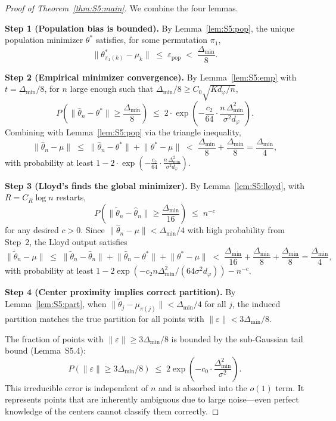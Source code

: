 \documentclass[twoside]{article}
\theoremstyle{plain}
\theoremstyle{definition}
\theoremstyle{remark}
\newcommand{\1}{\mathbf{1}}
\renewcommand{\epsilon}{\varepsilon}
\renewcommand{\phi}{\varphi}
\newcommand{\htheta}{\hat{\theta}}
\newcommand{\ttheta}{\tilde{\theta}}
\newcommand{\muk}{\mu_k}
\newcommand{\norm}[1]{\lVert#1\rVert}
\begin{document}
\begin{proof}[Proof of Theorem~\ref{thm:S5:main}]
We combine the four lemmas.

\noindent\textbf{Step 1 (Population bias is bounded).}
By Lemma~\ref{lem:S5:pop}, the unique population minimizer $\theta^*$
satisfies, for some permutation $\pi_1$,
\[
\norm{\theta^*_{\pi_1(k)}-\muk} \;\le\; \epsilon_{\mathrm{pop}}
\;<\; \frac{\Delta_{\min}}{8}.
\]

\noindent\textbf{Step 2 (Empirical minimizer convergence).}
By Lemma~\ref{lem:S5:emp} with $t=\Delta_{\min}/8$, for $n$ large
enough such that $\Delta_{\min}/8\ge C_0\sqrt{K d_\phi/n}$,
\[
P\!\left(\norm{\htheta_n-\theta^*}\ge\frac{\Delta_{\min}}{8}\right)
\;\le\; 2\cdot\exp\!\left(
          -\frac{c_2}{64}\cdot\frac{n\,\Delta_{\min}^2}{\sigma^2 d_\phi}\right).
\]
Combining with Lemma~\ref{lem:S5:pop} via the triangle inequality,
\[
\norm{\htheta_n-\mu}
\;\le\; \norm{\htheta_n-\theta^*} + \norm{\theta^*-\mu}
\;<\; \frac{\Delta_{\min}}{8} + \frac{\Delta_{\min}}{8}
= \frac{\Delta_{\min}}{4},
\]
with probability at least
$1-2\cdot\exp\!\left(-\frac{c_2}{64}\cdot\frac{n\,\Delta_{\min}^2}{\sigma^2 d_\phi}\right)$.

\noindent\textbf{Step 3 (Lloyd's finds the global minimizer).}
By Lemma~\ref{lem:S5:lloyd}, with $R=C_R\log n$ restarts,
\[
P\!\left(\norm{\ttheta_n-\htheta_n}\ge\frac{\Delta_{\min}}{16}\right)
\;\le\; n^{-c}
\]
for any desired $c>0$.  Since $\norm{\htheta_n-\mu}<\Delta_{\min}/4$
with high probability from Step~2, the Lloyd output satisfies
\[
\norm{\ttheta_n-\mu}
\;\le\; \norm{\ttheta_n-\htheta_n}
      + \norm{\htheta_n-\theta^*}
      + \norm{\theta^*-\mu}
\;<\; \frac{\Delta_{\min}}{16}
     + \frac{\Delta_{\min}}{8}
     + \frac{\Delta_{\min}}{8}
= \frac{\Delta_{\min}}{4},
\]
with probability at least
$1-2\exp\!\left(-c_2 n\Delta_{\min}^2/(64\sigma^2 d_\phi)\right)-n^{-c}$.

\noindent\textbf{Step 4 (Center proximity implies correct partition).}
By Lemma~\ref{lem:S5:part}, when
$\norm{\ttheta_j-\mu_{\pi(j)}}<\Delta_{\min}/4$ for all $j$, the induced
partition matches the true partition for all points with
$\norm{\varepsilon}<3\Delta_{\min}/8$.

The fraction of points with $\norm{\varepsilon}\ge3\Delta_{\min}/8$ is
bounded by the sub-Gaussian tail bound (Lemma~S5.4):
\[
P(\norm{\varepsilon}\ge3\Delta_{\min}/8)
\;\le\; 2\exp\!\left(-c_0\cdot\frac{\Delta_{\min}^2}{\sigma^2}\right).
\]
This irreducible error is independent of $n$ and is absorbed into the
$o(1)$ term.  It represents points that are inherently ambiguous due to
large noise---even perfect knowledge of the centers cannot classify them
correctly.


\end{proof}
\end{document}
